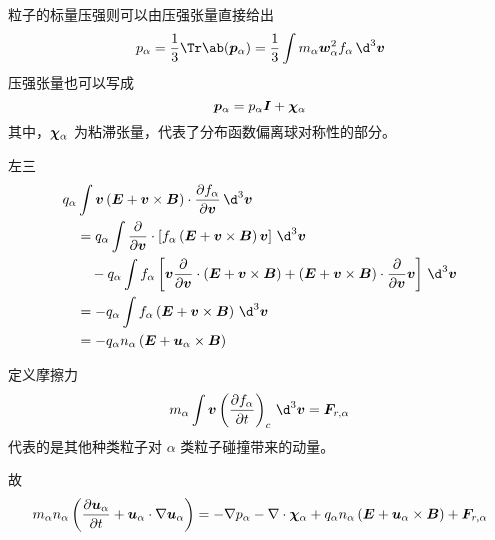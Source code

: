 粒子的标量压强则可以由压强张量直接给出
\begin{equation}
    p_\alpha = \frac{1}{3} \Tr\ab(\vector{p}_\alpha)
    = \frac{1}{3} \int m_\alpha \vector{w}_\alpha^2 f_\alpha \, \d^3 \vector{v}
\end{equation}
压强张量也可以写成
\begin{equation}
    \bm{p}_\alpha = p_\alpha \bm{I} + \bm{\chi}_\alpha
\end{equation}
其中，$\bm{\chi}_\alpha$ 为粘滞张量，代表了分布函数偏离球对称性的部分。

左三
\begin{equation}\begin{aligned}
&q_\alpha \int
    \vector{v} \left( \vector{E} + \vector{v} \times \vector{B} \right)
    \cdot \pDeriv{f_\alpha}{\vector{v}}
\, \d^3 \vector{v} \\
& \quad = q_\alpha \int \pDeriv{}{\vector{v}} \cdot \left[
    f_\alpha \left( \vector{E} + \vector{v} \times \vector{B} \right) \vector{v}
\right] \, \d^3 \vector{v} \\
& \quad \quad - q_\alpha \int f_\alpha \left[
    \vector{v} \pDeriv{}{\vector{v}} \cdot \left( \vector{E} + \vector{v} \times \vector{B} \right)
    + \left( \vector{E} + \vector{v} \times \vector{B} \right) \cdot \pDeriv{}{\vector{v}} \vector{v}
\right] \, \d^3 \vector{v} \\
& \quad = - q_\alpha \int f_\alpha \left( \vector{E} + \vector{v} \times \vector{B} \right) \, \d^3 \vector{v} \\
& \quad = - q_\alpha n_\alpha \left( \vector{E} + \vector{u}_\alpha \times \vector{B} \right)
\end{aligned}\end{equation}

定义摩擦力
\begin{equation}
    m_\alpha \int \vector{v} \left( \pDeriv{f_\alpha}{t} \right)_c \, \d^3 \vector{v}
    = \vector{F}_{r,\alpha}
\end{equation}
代表的是其他种类粒子对 $\alpha$ 类粒子碰撞带来的动量。

故
\begin{equation}\label{eq:Fluid_动量方程}
m_\alpha n_\alpha \left(
    \frac{\partial {\bm{u}_\alpha}}{\partial {t}} + \bm{u}_\alpha \cdot \nabla {\bm{u}_\alpha}
\right)
= - \nabla {p_\alpha} - \nabla \cdot {\bm{\chi}_\alpha} + q_\alpha n_\alpha \left( \bm{E} + \bm{u}_\alpha \times \bm{B} \right) + \bm{F}_{r,\alpha}
\end{equation}


